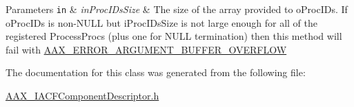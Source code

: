 \begin{DoxyParams}[1]{Parameters}
\mbox{\tt in}  & {\em in\+Proc\+I\+Ds\+Size} & The size of the array provided to {\ttfamily o\+Proc\+I\+Ds}. If {\ttfamily o\+Proc\+I\+Ds} is non-\/\+N\+U\+L\+L but {\ttfamily i\+Proc\+I\+Ds\+Size} is not large enough for all of the registered Process\+Procs (plus one for N\+U\+L\+L termination) then this method will fail with \hyperlink{a00207_a5f8c7439f3a706c4f8315a9609811937af9fc41c647e2c9959ed6ebb45191be52}{A\+A\+X\+\_\+\+E\+R\+R\+O\+R\+\_\+\+A\+R\+G\+U\+M\+E\+N\+T\+\_\+\+B\+U\+F\+F\+E\+R\+\_\+\+O\+V\+E\+R\+F\+L\+O\+W} \\
\hline
\end{DoxyParams}


The documentation for this class was generated from the following file\+:\begin{DoxyCompactItemize}
\item 
\hyperlink{a00218}{A\+A\+X\+\_\+\+I\+A\+C\+F\+Component\+Descriptor.\+h}\end{DoxyCompactItemize}
